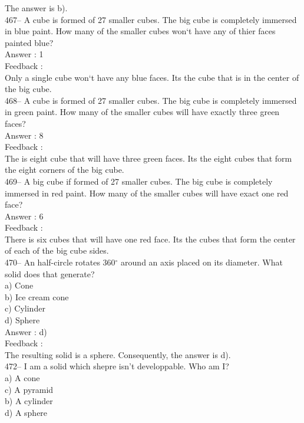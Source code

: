 ﻿\documentclass[letterpaper, 12pt]{article}
\begin{document}
The answer is b).\\

467-- A cube is formed of 27 smaller cubes. The big cube is completely immersed
in blue paint. How many of the smaller cubes won`t have any of thier faces painted blue?\\

Answer : 1\\

Feedback : \\
Only a single cube won`t have any blue faces. Its the cube that is in the center of the big cube.\\

468-- A cube is formed of 27 smaller cubes. The big cube is completely immersed
in green paint.  How many of the smaller cubes will have exactly three green faces?\\

Answer : 8\\

Feedback : \\
The is eight cube that will have three green faces. Its the eight cubes that form the eight corners of the big cube. \\

469-- A big cube if formed of 27 smaller cubes. The big cube is completely immersed in red paint. How many of the smaller cubes will have exact one red face?\\

Answer : 6\\

Feedback : \\
There is six cubes that will have one red face. Its the cubes that form the center of each of the big cube sides.  \\


470-- An half-circle rotates 360$^{\circ}$ around an axis placed on its diameter. What solid does that generate?\\
a) Cone\\
b) Ice cream cone\\
c) Cylinder\\
d) Sphere\\

Answer : d)\\

Feedback : \\
The resulting solid is a sphere.  Consequently, the answer is d).\\


472-- I am a solid which shepre isn't developpable. Who am I?\\
a) A cone\\
c) A pyramid\\
b) A cylinder\\
d) A sphere\\
\end{document}
